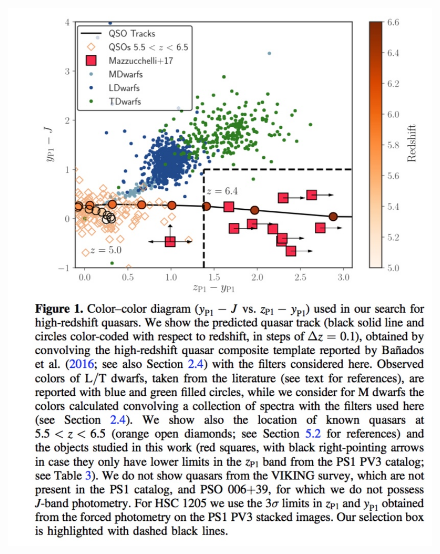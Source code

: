 \documentclass[11pt,a4paper]{article}
\begin{document}
    \begin{figure}
      \begin{center}
      \includegraphics[width=16.0cm,  trim={1.5cm 0 0 0},clip]
      {Mazzucchelli_2017_Fig1.jpeg}
     \caption[]{\citet{Mazzucchelli2017}}
      \label{fig:Mazzucchelli2017}
      \end{center}
    \end{figure}
\end{document}
